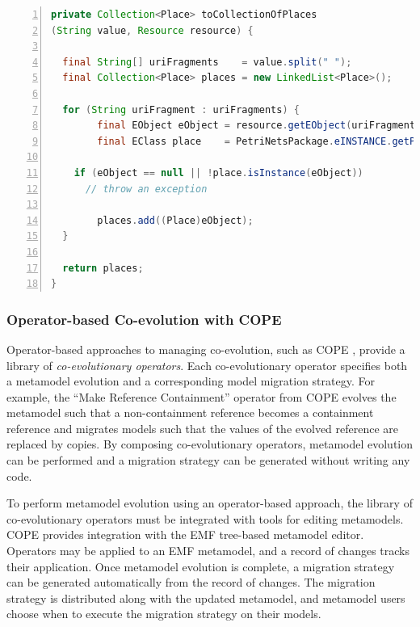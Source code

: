\begin{lstlisting}[basicstyle=\ttfamily\footnotesize, flexiblecolumns=true, numbers=left, nolol=true, caption=Java method for deserialising a reference., label=lst:java, language=Java, tabsize=2]
private Collection<Place> toCollectionOfPlaces
(String value, Resource resource) {

  final String[] uriFragments    = value.split(" ");
  final Collection<Place> places = new LinkedList<Place>();
 
  for (String uriFragment : uriFragments) {
		final EObject eObject = resource.getEObject(uriFragment);
		final EClass place    = PetriNetsPackage.eINSTANCE.getPlace();

    if (eObject == null || !place.isInstance(eObject))
      // throw an exception
						
		places.add((Place)eObject);
  }
 
  return places;
}
\end{lstlisting}

\subsubsection{Operator-based Co-evolution with COPE}
\label{subsubsec:cope}

Operator-based approaches to managing co-evolution, such as COPE \cite{herrmannsdoerfer09cope}, provide a library of \emph{co-evolutionary operators}. Each co-evolutionary operator specifies both a metamodel evolution and a corresponding model migration strategy. For example, the ``Make Reference Containment'' operator from COPE \cite{herrmannsdoerfer09cope} evolves the metamodel such that a non-containment reference becomes a containment reference and migrates models such that the values of the evolved reference are replaced by copies. By composing co-evolutionary operators, metamodel evolution can be performed and a migration strategy can be generated without writing any code.

To perform metamodel evolution using an operator-based approach, the library of co-evolutionary operators must be integrated with tools for editing metamodels. COPE provides integration with the EMF tree-based metamodel editor. Operators may be applied to an EMF metamodel, and a record of changes tracks their application. Once metamodel evolution is complete, a migration strategy can be generated automatically from the record of changes. The migration strategy is distributed along with the updated metamodel, and metamodel users choose when to execute the migration strategy on their models.

